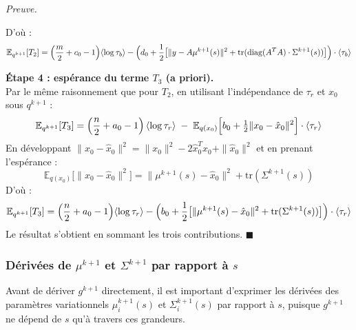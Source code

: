 \documentclass[12pt]{article}
\renewcommand{\qedsymbol}{$\blacksquare$}
\renewenvironment{proof}[1][\proofname]{%
  \par\medskip\noindent
  \textit{\color{proofgray}#1.}\enspace\ignorespaces
}{\hfill\qedsymbol\par\medskip}
\renewcommand{\proofname}{Preuve}
\begin{document}
\begin{proof}
D'où :
\begin{equation*}
\mathbb{E}_{q^{k+1}}[T_2] = \Bigl(\frac{m}{2} + c_0 -1\Bigr) \langle\log\tau_b\rangle - \Bigl( d_0 + \frac{1}{2}\bigl[ \| y - A \mu^{k+1}(s) \|^2 + \mathrm{tr}(\mathrm{diag}(A^TA)\cdot \Sigma^{k+1}(s) ) \bigr] \Bigr)\cdot \langle\tau_b\rangle
\end{equation*}

\medskip
\textbf{Étape 4 : espérance du terme $T_3$ (a priori).}\\
Par le même raisonnement que pour $T_2$, en utilisant l'indépendance de $\tau_r$ et $x_0$ sous $q^{k+1}$ :
\begin{equation*}
\mathbb{E}_{q^{k+1}}[T_3] = \Bigl(\frac{n}{2} + a_0 - 1\Bigr)\, \langle\log\tau_r\rangle
\;-\; \mathbb{E}_{q(x_0)}\Bigl[b_0 + \tfrac{1}{2}\|x_0 - \hat{x}_0\|^2\Bigr]\cdot \langle\tau_r\rangle
\end{equation*}
En développant $\|x_0 - \hat{x}_0\|^2 = \|x_0\|^2 - 2\hat{x}_0^T x_0 + \|\hat{x}_0\|^2$ et en prenant l'espérance :
\begin{equation*}
\mathbb{E}_{q(x_0)}\bigl[\|x_0 - \hat{x}_0\|^2\bigr]
= \|\mu^{k+1}(s) - \hat{x}_0\|^2 + \mathrm{tr}(\Sigma^{k+1}(s))
\end{equation*}
D'où :
\begin{equation*}
\mathbb{E}_{q^{k+1}}[T_3] = \Bigl(\frac{n}{2} + a_0 -1\Bigr) \langle\log\tau_r\rangle - \Bigl( b_0 + \frac{1}{2} \bigl[ \| \mu^{k+1}(s) - \hat{x}_0 \|^2 + \mathrm{tr}( \Sigma^{k+1}(s)) \bigr] \Bigr) \cdot \langle\tau_r\rangle
\end{equation*}
Le résultat s'obtient en sommant les trois contributions.
\end{proof}

\subsubsection*{Dérivées de $\mu^{k+1}$ et $\Sigma^{k+1}$ par rapport à $s$}

Avant de dériver $g^{k+1}$ directement, il est important d'exprimer les dérivées des paramètres variationnels $\mu_i^{k+1}(s)$ et $\Sigma_i^{k+1}(s)$ par rapport à $s$, puisque $g^{k+1}$ ne dépend de $s$ qu'à travers ces grandeurs.
\end{document}
